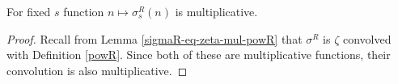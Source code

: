 \begin{theorem}
\label{isMultiplicative_sigmaR}
\leanok
For fixed $s$ function $n\mapsto\sigma^R_s(n)$ is multiplicative.
\end{theorem}
\begin{proof}
\leanok
Recall from Lemma \ref{sigmaR-eq-zeta-mul-powR} that $\sigma^R$ is $\zeta$ convolved with
    Definition \ref{powR}. Since both of these are multiplicative functions, their convolution is
    also multiplicative.
\end{proof}
